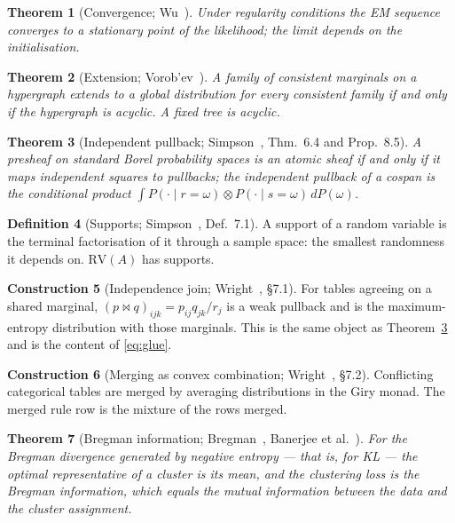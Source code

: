\documentclass[11pt,a4paper]{article}
\theoremstyle{plain}
\newtheorem{theorem}{Theorem}
\theoremstyle{definition}
\newtheorem{definition}[theorem]{Definition}
\newtheorem{construction}[theorem]{Construction}
\begin{document}
\begin{theorem}[Convergence; Wu~\cite{wu1983}]
\label{thm:wu}
Under regularity conditions the EM sequence converges to a stationary point of
the likelihood; the limit depends on the initialisation.
\end{theorem}

\begin{theorem}[Extension; Vorob'ev~\cite{vorobev1962}]
\label{thm:vorobev}
A family of consistent marginals on a hypergraph extends to a global
distribution for every consistent family if and only if the hypergraph is
acyclic. A fixed tree is acyclic.
\end{theorem}

\begin{theorem}[Independent pullback; Simpson~\cite{simpson2024}, Thm.~6.4 and Prop.~8.5]
\label{thm:simpson-pullback}
A presheaf on standard Borel probability spaces is an atomic sheaf if and only
if it maps independent squares to pullbacks; the independent pullback of a
cospan is the conditional product $\int P(\cdot\mid r{=}\omega)\otimes
P(\cdot\mid s{=}\omega)\,dP(\omega)$.
\end{theorem}

\begin{definition}[Supports; Simpson~\cite{simpson2024}, Def.~7.1]
\label{def:supports}
A support of a random variable is the terminal factorisation of it through a
sample space: the smallest randomness it depends on. $\mathrm{RV}(A)$ has
supports.
\end{definition}

\begin{construction}[Independence join; Wright~\cite{wright2023}, \S7.1]
\label{con:join}
For tables agreeing on a shared marginal, $(p\bowtie q)_{ijk} = p_{ij}q_{jk}/r_j$
is a weak pullback and is the maximum-entropy distribution with those
marginals. This is the same object as Theorem~\ref{thm:simpson-pullback} and is
the content of \eqref{eq:glue}.
\end{construction}

\begin{construction}[Merging as convex combination; Wright~\cite{wright2023}, \S7.2]
\label{con:merge-giry}
Conflicting categorical tables are merged by averaging distributions in the
Giry monad. The merged rule row is the mixture of the rows merged.
\end{construction}

\begin{theorem}[Bregman information; Bregman~\cite{bregman1967},
Banerjee et al.~\cite{banerjee2005}]
\label{thm:bregman}
For the Bregman divergence generated by negative entropy --- that is, for KL ---
the optimal representative of a cluster is its mean, and the clustering loss is
the Bregman information, which equals the mutual information between the data
and the cluster assignment.
\end{theorem}
\end{document}
